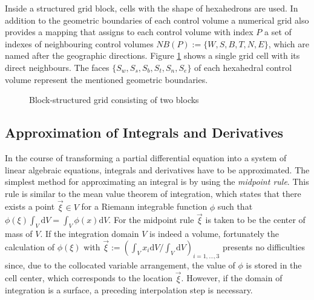Inside a structured grid block, cells with the shape of hexahedrons are used. In addition to the geometric boundaries of each control volume a numerical grid also provides a mapping that assigns to each control volume with index \(P\) a set of indexes of neighbouring control volumes \(NB(P):=\{W,S,B,T,N,E\}\), which are named after the geographic directions. Figure \ref{fig:blockstruc} shows a single grid cell with its direct neighbours. The faces \(\{S_w,S_s,S_b,S_t,S_n,S_e\}\) of each hexahedral control volume represent the mentioned geometric boundaries. 

\begin{figure}[h]
  \qquad
  \caption{Block-structured grid consisting of two blocks}
  \label{fig:blockstruc}
 \end{figure}

\subsection{Approximation of Integrals and Derivatives}
\label{sec:approxintegralderivative}

In the course of transforming a partial differential equation into a system of linear algebraic equations, integrals and derivatives have to be approximated. The simplest method for approximating an integral is by using the \emph{midpoint rule}. This rule is similar to the mean value theorem of integration, which states that there exists a point \(\vec{\xi} \in V\) for a Riemann integrable function \(\phi\) such that \(\textstyle \phi(\xi) \int_V \mathrm{d}V = \int_V \phi(x) \mathrm{d}V\). For the midpoint rule \(\vec{\xi}\) is taken to be the center of mass of \(V\). If the integration domain \(V\) is indeed a volume, fortunately the calculation of \(\phi(\mathbb{\xi})\) with \(\textstyle \vec{\xi} := \left({ \int_V x_i \mathrm{d}V }/{ \int_V \mathrm{d}V } \right)_{i = 1,\dots,3}\) presents no difficulties since, due to the collocated variable arrangement, the value of \(\phi\) is stored in the cell center, which corresponds to the location \(\vec{\xi}\). However, if the domain of integration is a surface, a preceding interpolation step is necessary.

